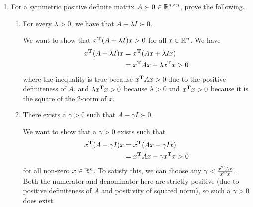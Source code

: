\documentclass{article}
\begin{document}
\begin{enumerate}[label=(\alph*)]
    \item For a symmetric positive definite matrix $A \succ 0 \in \mathbb{R}^{n\times n}$, prove the following.
    \begin{enumerate}[label=(\roman*)]
        \item For every $\lambda > 0$, we have that $A + \lambda I \succ 0$.
          \begin{mdframed}
            We want to show that $x^{\mathbf{T}}(A + \lambda I) x > 0$ for all $x \in \mathbb{R}^n$. We have
            \begin{align*}
              x^{\mathbf{T}}(A + \lambda I) x
              &= x^{\mathbf{T}}(Ax + \lambda Ix) \\
              &= x^{\mathbf{T}} Ax + \lambda x^{\mathbf{T}} x > 0
            \end{align*}
            where the inequality is true because $x^{\mathbf{T}} Ax > 0$ due to the
            positive definiteness of $A$, and $\lambda x^{\mathbf{T}} x > 0$ because
            $\lambda > 0$ and $x^{\mathbf{T}} x > 0$ because it is the square of the
            2-norm of $x$.
          \end{mdframed}
        \item There exists a $\gamma > 0$ such that $A - \gamma I \succ 0$.
          \begin{mdframed}
            We want to show that a $\gamma > 0$ exists such that
            \begin{align*}
              x^{\mathbf{T}}(A - \gamma I) x
              &= x^{\mathbf{T}}(Ax - \gamma Ix) \\
              &= x^{\mathbf{T}} Ax - \gamma x^{\mathbf{T}} x > 0
            \end{align*}
            for all non-zero $x \in \mathbb{R}^n$. To satisfy this, we can choose any
            $\gamma < \frac{x^{\mathbf{T}} Ax}{x^{\mathbf{T}} x}$. Both the numerator and
            denominator here are strictly positive (due to positive
            definiteness of $A$ and positivity of squared norm), so such a
            $\gamma > 0$ does exist.

\end{mdframed}
\end{enumerate}
\end{enumerate}
\end{document}
